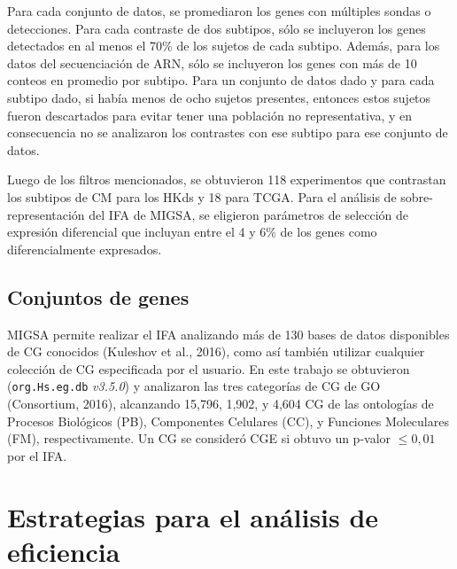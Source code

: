 \documentclass[12pt,twoside]{reedthesis}
\begin{document}
Para cada conjunto de datos, se promediaron los genes con múltiples sondas o detecciones. Para cada contraste de dos subtipos, sólo se incluyeron los genes detectados en al menos el 70\% de los sujetos de cada subtipo. Además, para los datos del secuenciación de ARN, sólo se incluyeron los genes con más de 10 conteos en promedio por subtipo. Para un conjunto de datos dado y para cada subtipo dado, si había menos de ocho sujetos presentes, entonces estos sujetos fueron descartados para evitar tener una población no representativa, y en consecuencia no se analizaron los contrastes con ese subtipo para ese conjunto de datos.

\par

Luego de los filtros mencionados, se obtuvieron 118 experimentos que contrastan los subtipos de CM para los HKds y 18 para TCGA. Para el análisis de sobre-representación del IFA de MIGSA, se eligieron parámetros de selección de expresión diferencial que incluyan entre el 4 y 6\% de los genes como diferencialmente expresados.

\hypertarget{conjuntos-de-genes-1}{%
\subsection{Conjuntos de genes}\label{conjuntos-de-genes-1}}

\par

MIGSA permite realizar el IFA analizando más de 130 bases de datos disponibles de CG conocidos (Kuleshov et al., 2016), como así también utilizar cualquier colección de CG especificada por el usuario. En este trabajo se obtuvieron (\texttt{org.Hs.eg.db} \emph{v3.5.0}) y analizaron las tres categorías de CG de GO (Consortium, 2016), alcanzando 15,796, 1,902, y 4,604 CG de las ontologías de Procesos Biológicos (PB), Componentes Celulares (CC), y Funciones Moleculares (FM), respectivamente. Un CG se consideró CGE si obtuvo un p-valor \(\le 0,01\) por el IFA.

\hypertarget{estrategias-para-el-anuxe1lisis-de-eficiencia}{%
\section{Estrategias para el análisis de eficiencia}\label{estrategias-para-el-anuxe1lisis-de-eficiencia}}

\par
\end{document}
